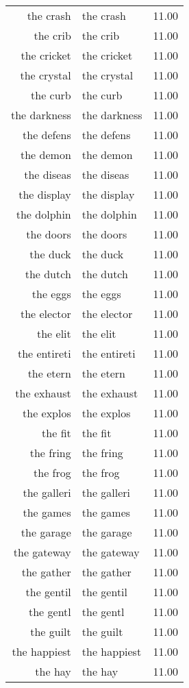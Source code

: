\begin{table}[ht]
\begin{tabular}{rlr}
  the crash & the crash & 11.00 \\ 
  the crib & the crib & 11.00 \\ 
  the cricket & the cricket & 11.00 \\ 
  the crystal & the crystal & 11.00 \\ 
  the curb & the curb & 11.00 \\ 
  the darkness & the darkness & 11.00 \\ 
  the defens & the defens & 11.00 \\ 
  the demon & the demon & 11.00 \\ 
  the diseas & the diseas & 11.00 \\ 
  the display & the display & 11.00 \\ 
  the dolphin & the dolphin & 11.00 \\ 
  the doors & the doors & 11.00 \\ 
  the duck & the duck & 11.00 \\ 
  the dutch & the dutch & 11.00 \\ 
  the eggs & the eggs & 11.00 \\ 
  the elector & the elector & 11.00 \\ 
  the elit & the elit & 11.00 \\ 
  the entireti & the entireti & 11.00 \\ 
  the etern & the etern & 11.00 \\ 
  the exhaust & the exhaust & 11.00 \\ 
  the explos & the explos & 11.00 \\ 
  the fit & the fit & 11.00 \\ 
  the fring & the fring & 11.00 \\ 
  the frog & the frog & 11.00 \\ 
  the galleri & the galleri & 11.00 \\ 
  the games & the games & 11.00 \\ 
  the garage & the garage & 11.00 \\ 
  the gateway & the gateway & 11.00 \\ 
  the gather & the gather & 11.00 \\ 
  the gentil & the gentil & 11.00 \\ 
  the gentl & the gentl & 11.00 \\ 
  the guilt & the guilt & 11.00 \\ 
  the happiest & the happiest & 11.00 \\ 
  the hay & the hay & 11.00 \\ 

\end{tabular}
\end{table}

